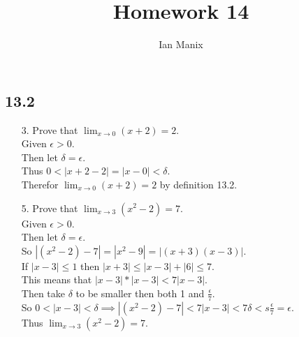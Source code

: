 \documentclass[sigconf]{article}
\title{
  \textbf{Homework 14} \\
  }
\author{ 
  Ian Manix
  }
\begin{document}



\maketitle




\subsection*{13.2}
\begin{itemize}
  \item[3.] Prove that $\lim_{x\to0}(x+2)=2$.\\
            Given $\epsilon >0$.\\
            Then let $\delta=\epsilon$.\\
            Thus $0<|x+2-2|=|x-0|<\delta$.\\
            Therefor $\lim_{x\to0}(x+2)=2$ by definition 13.2.\\

  \item[5.] Prove that $\lim_{x\to3}(x^2-2)=7$.\\
            Given $\epsilon>0$.\\
            Then let $\delta=\epsilon$.\\
            So $|(x^2-2)-7|=|x^2-9|=|(x+3)(x-3)|$.\\
            If $|x-3|\leq1$ then $|x+3|\leq|x-3|+|6|\leq7$.\\
            This means that $|x-3|*|x-3|<7|x-3|$.\\
            Then take $\delta$ to be smaller then both 1 and $\frac{\epsilon}{7}$.\\
            So $0<|x-3|<\delta\implies|(x^2-2)-7|<7|x-3|<7\delta<s\frac{\epsilon}{7}=\epsilon$.\\
            Thus $\lim_{x\to3}(x^2-2)=7$.
\end{itemize}
\end{document}

